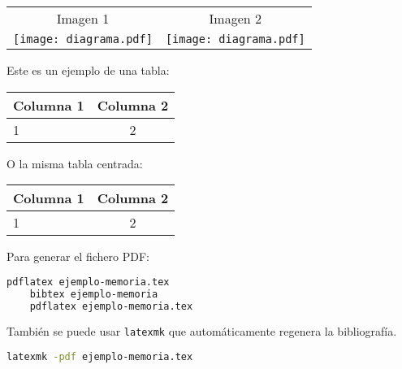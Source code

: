   \begin{tabular}{cc}
    Imagen 1 & Imagen 2 \\[2mm]
    \texttt{[image: diagrama.pdf]} &  \texttt{[image: diagrama.pdf]}
  \end{tabular}

  Este es un ejemplo de una tabla:

  \begin{tabular}{|l|c|}
    \hline
    Columna 1 & Columna 2 \\ \hline
    1 & 2 \\ \hline
  \end{tabular}


  \vspace*{1cm}
  O la misma tabla centrada:

  \begin{center}
    \begin{tabular}{|l|c|}
      \hline
      Columna 1 & Columna 2 \\ \hline
      1 & 2 \\ \hline
    \end{tabular}
  \end{center}

  Para generar el fichero PDF:

  \begin{lstlisting}[language=bash,caption={Comandos para generar PDF con pdflatex}]
    pdflatex ejemplo-memoria.tex
    bibtex ejemplo-memoria
    pdflatex ejemplo-memoria.tex
\end{lstlisting}

  También se puede usar \texttt{latexmk} que automáticamente regenera la bibliografía.
  \begin{lstlisting}[language=bash,caption={Comandos para generar PDF con latexmk}]
    latexmk -pdf ejemplo-memoria.tex
\end{lstlisting}
